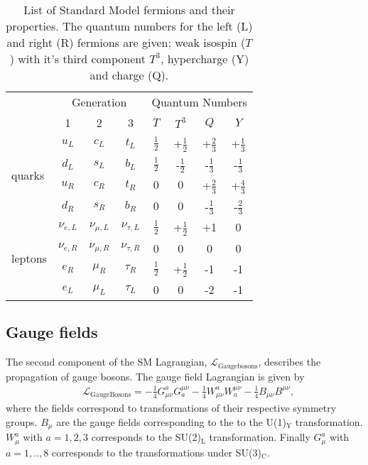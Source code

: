 \begin{table}[htp]
    \centering
    {
    \begin{tabular}{l | c c c | c c c c}
    \toprule
      & \multicolumn{3}{c|}{Generation} &  \multicolumn{4}{c}{Quantum Numbers}  \\
      & 1 & 2 & 3 & $T$ & $T^3$ & $Q$ & $Y$ \\ 
    \hline
    \multirow{4}{*}[0.5em]{quarks} & $u_L$ & $c_L$ & $t_L$ & $\frac{1}{2}$ & +$\frac{1}{2}$ & +$\frac{2}{3}$ & +$\frac{1}{3}$ \\
    & $d_L$ & $s_L$ & $b_L$ & $\frac{1}{2}$ & -$\frac{1}{2}$ & -$\frac{1}{3}$ & -$\frac{1}{3}$ \\
    & $u_R$ & $c_R$ & $t_R$ & $ 0$ & $0$ & +$\frac{2}{3}$ & +$\frac{4}{3}$ \\
    & $d_R$ & $s_R$ & $b_R$ & $ 0$ & $0$ & -$\frac{1}{3}$ & -$\frac{2}{3}$ \\
    \midrule
    \multirow{4}{*}[0.5em]{leptons} & $\nu_{e,L}$ & $\nu_{\mu,L}$ & $\nu_{\tau,L}$ & $\frac{1}{2}$ & +$\frac{1}{2}$ & +1 & 0 \\
    & $\nu_{e,R}$ & $\nu_{\mu,R}$ & $\nu_{\tau,R}$ & 0 & 0 & 0 & 0 \\
        & $e_R$ & $\mu_R$ & $\tau_R$ & $\frac{1}{2}$ & +$\frac{1}{2}$ & -1 & -1 \\
        & $e_L$ & $\mu_L$ & $\tau_L$ & 0 & 0 & -2 & -1 \\
    \bottomrule
    \end{tabular}
    }
    \caption{List of Standard Model fermions and their properties. The quantum numbers for the left (L) and right (R) fermions are given; weak isospin ($T$) with it's third component $T^3$, hypercharge (Y) and charge (Q).}
    \label{tab:fermions}
\end{table}

\subsection{Gauge fields}\label{sec:gaugeFields}
The second component of the SM Lagrangian, $\mathcal{L}_{\mathrm{Gauge bosons}}$, describes the propagation of gauge bosons. The gauge field Lagrangian is given by
\begin{equation}
    \label{eq:lagrangianGauge}
    \begin{aligned}
        & \mathcal{L}_\mathrm{Gauge Bosons} = -\frac{1}{4}G^a_{\mu\nu}G_a^{\mu\nu} -\frac{1}{4}W^a_{\mu\nu}W_a^{\mu\nu} -\frac{1}{4}B_{\mu\nu}B^{\mu\nu},
    \end{aligned}
\end{equation}
where the fields correspond to transformations of their respective symmetry groups. $B_\mu$ are the gauge fields corresponding to the to the U(1)$_\mathrm{Y}$ transformation. $W_\mu^a$ with $a = 1,2,3$ corresponds to the SU(2)$_\mathrm{L}$ transformation. Finally $G_\mu^a$ with $a = 1,..,8$ corresponds to the transformations under SU(3)$_\mathrm{C}$. 

